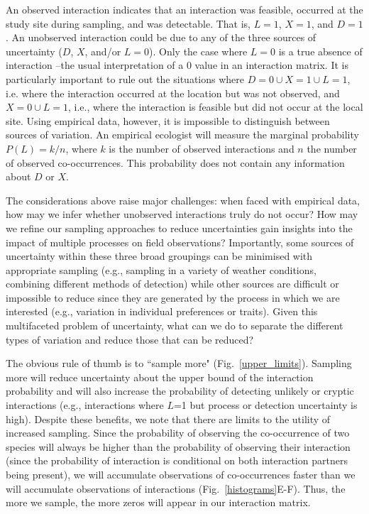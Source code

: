\documentclass[12pt]{article}
\begin{document}
\begin{spacing}{2.0}
    An observed interaction indicates that an interaction was feasible, occurred at the study site during sampling, and was detectable. That is, $L = 1$, $X = 1$, and $D = 1$. An unobserved interaction could be due to any of the three sources of uncertainty ($D$, $X$, and/or $L = 0$). Only the case where $L = 0$ is a true absence of interaction --the usual interpretation of a $0$ value in an interaction matrix. It is particularly important to rule out the situations where $D=0 \cup X = 1 \cup L=1$, i.e. where the interaction occurred at the location but was not observed, and $X = 0 \cup L =1$, i.e., where the interaction is feasible but did not occur at the local site. 
    Using empirical data, however, it is impossible to distinguish between sources of variation. An empirical ecologist will measure the marginal probability $P(L) = k/n$, where $k$ is the number of observed interactions and $n$ the number of observed co-occurrences. This probability does not contain any information about $D$ or $X$.


    The considerations above raise major challenges: when faced with empirical data, how may we infer whether unobserved interactions truly do not occur? How may we refine our sampling approaches to reduce uncertainties gain insights into the impact of multiple processes on field observations? Importantly, some sources of uncertainty within these three broad groupings can be minimised with appropriate sampling (e.g., sampling in a variety of weather conditions, combining different methods of detection) while other sources are difficult or impossible to reduce since they are generated by the process in which we are interested (e.g., variation in individual preferences or traits). Given this multifaceted problem of uncertainty, what can we do to separate the different types of variation and reduce those that can be reduced?


    The obvious rule of thumb is to ``sample more" (Fig.~\ref{upper_limits}). Sampling more will reduce uncertainty about the upper bound of the interaction probability and will also increase the probability of detecting unlikely or cryptic interactions (e.g., interactions where $L$=1 but process or detection uncertainty is high). Despite these benefits, we note that there are limits to the utility of increased sampling. Since the probability of observing the co-occurrence of two species will always be higher than the probability of observing their interaction (since the probability of interaction is conditional on both interaction partners being present), we will accumulate observations of co-occurrences faster than we will accumulate observations of interactions (Fig.~\ref{histograms}E-F). Thus, the more we sample, the more zeros will appear in our interaction matrix.



\end{spacing}
\end{document}

